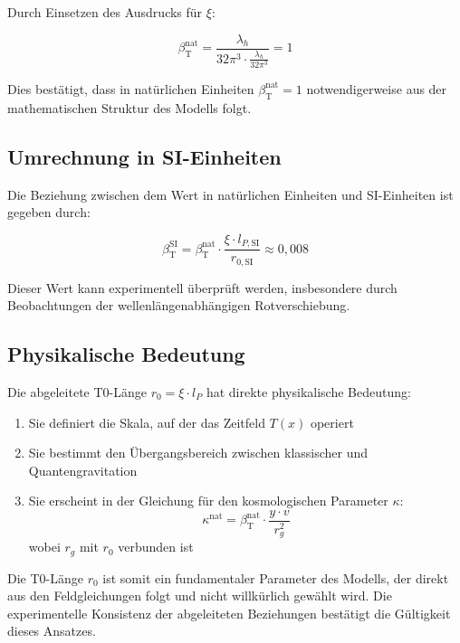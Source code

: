 \documentclass[12pt,a4paper]{article}
\newcommand{\Tfield}{T(x)}
\newcommand{\betaT}{\beta_{\text{T}}}
\begin{document}
	Durch Einsetzen des Ausdrucks für \(\xi\):
	
	\begin{equation}
		\betaT^{\text{nat}} = \frac{\lambda_h}{32\pi^3 \cdot \frac{\lambda_h}{32\pi^3}} = 1
	\end{equation}
	
	Dies bestätigt, dass in natürlichen Einheiten \(\betaT^{\text{nat}} = 1\) notwendigerweise aus der mathematischen Struktur des Modells folgt.
	
	\subsection{Umrechnung in SI-Einheiten}
	
	Die Beziehung zwischen dem Wert in natürlichen Einheiten und SI-Einheiten ist gegeben durch:
	
	\begin{equation}
		\betaT^{\text{SI}} = \betaT^{\text{nat}} \cdot \frac{\xi \cdot l_{P,\text{SI}}}{r_{0,\text{SI}}} \approx 0,008
	\end{equation}
	
	Dieser Wert kann experimentell überprüft werden, insbesondere durch Beobachtungen der wellenlängenabhängigen Rotverschiebung.
	
	\subsection{Physikalische Bedeutung}
	
	Die abgeleitete T0-Länge \(r_0 = \xi \cdot l_P\) hat direkte physikalische Bedeutung:
	
	\begin{enumerate}
		\item Sie definiert die Skala, auf der das Zeitfeld \(\Tfield\) operiert
		\item Sie bestimmt den Übergangsbereich zwischen klassischer und Quantengravitation
		\item Sie erscheint in der Gleichung für den kosmologischen Parameter \(\kappa\):
		\begin{equation}
			\kappa^{\text{nat}} = \betaT^{\text{nat}} \cdot \frac{y \cdot v}{r_g^2}
		\end{equation}
		wobei \(r_g\) mit \(r_0\) verbunden ist
	\end{enumerate}
	
	Die T0-Länge \(r_0\) ist somit ein fundamentaler Parameter des Modells, der direkt aus den Feldgleichungen folgt und nicht willkürlich gewählt wird. Die experimentelle Konsistenz der abgeleiteten Beziehungen bestätigt die Gültigkeit dieses Ansatzes.
	
\end{document}
